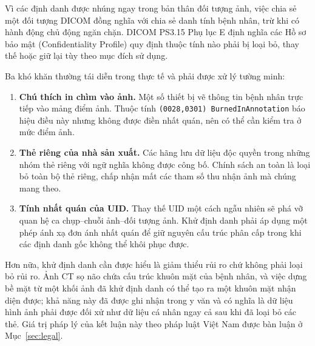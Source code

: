 Vì các định danh được nhúng ngay trong bản thân đối tượng ảnh, việc chia sẻ một
đối tượng DICOM đồng nghĩa với chia sẻ danh tính bệnh nhân, trừ khi có hành động
chủ động ngăn chặn. DICOM PS3.15 Phụ lục E \cite{dicomps315} định nghĩa các Hồ sơ bảo mật
(Confidentiality Profile) quy định thuộc tính nào phải bị loại bỏ, thay thế hoặc
giữ lại tùy theo mục đích sử dụng.

Ba khó khăn thường tái diễn trong thực tế và phải được xử lý tường minh:

\begin{enumerate}
    \item \textbf{Chú thích in chìm vào ảnh.} Một số thiết bị vẽ thông tin bệnh
          nhân trực tiếp vào mảng điểm ảnh. Thuộc tính
          \texttt{(0028,0301) BurnedInAnnotation} báo hiệu điều này nhưng không
          được điền nhất quán, nên có thể cần kiểm tra ở mức điểm ảnh.
    \item \textbf{Thẻ riêng của nhà sản xuất.} Các hãng lưu dữ liệu độc quyền
          trong những nhóm thẻ riêng với ngữ nghĩa không được công bố. Chính sách
          an toàn là loại bỏ toàn bộ thẻ riêng, chấp nhận mất các tham số thu
          nhận ảnh mà chúng mang theo.
    \item \textbf{Tính nhất quán của UID.} Thay thế UID một cách ngẫu nhiên sẽ
          phá vỡ quan hệ ca chụp--chuỗi ảnh--đối tượng ảnh. Khử định danh phải áp
          dụng một phép ánh xạ đơn ánh nhất quán để giữ nguyên cấu trúc phân cấp
          trong khi các định danh gốc không thể khôi phục được.
\end{enumerate}

Hơn nữa, khử định danh cần được hiểu là giảm thiểu rủi ro chứ không phải loại bỏ
rủi ro. Ảnh CT sọ não chứa cấu trúc khuôn mặt của bệnh nhân, và việc dựng bề mặt
từ một khối ảnh đã khử định danh có thể tạo ra một khuôn mặt nhận diện được; khả
năng này đã được ghi nhận trong y văn \cite{schwarz2019identification} và có nghĩa là dữ liệu hình ảnh phải được
đối xử như dữ liệu cá nhân ngay cả sau khi đã loại bỏ các thẻ. Giá trị pháp lý
của kết luận này theo pháp luật Việt Nam được bàn luận ở Mục~\ref{sec:legal}.
